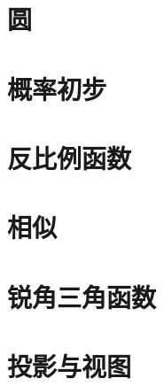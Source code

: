 \documentclass[lang=cn, 10pt, titlestyle=hang]{elegantbook}
\begin{document}
\chapter{圆}

\chapter{概率初步}

\chapter{反比例函数}

\chapter{相似}

\chapter{锐角三角函数}

\chapter{投影与视图}
\end{document}

